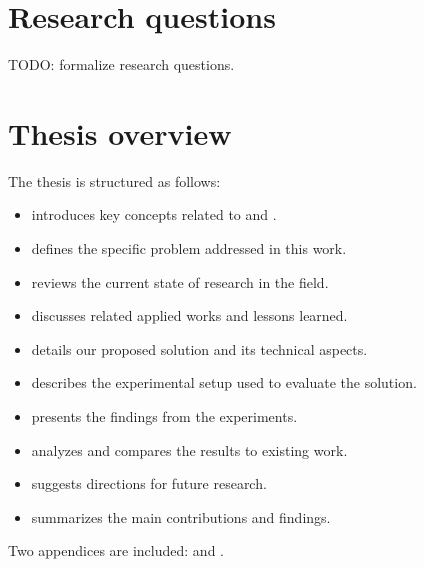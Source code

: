 \newpage %

\section{Research questions}

TODO: formalize research questions.

\section{Thesis overview}

The thesis is structured as follows:

\begin{itemize}
    \item {} introduces key concepts related to  and .
    \item {} defines the specific problem addressed in this work.
    \item {} reviews the current state of research in the field.
    \item {} discusses related applied works and lessons learned.
    \item {} details our proposed solution and its technical aspects.
    \item {} describes the experimental setup used to evaluate the solution.
    \item {} presents the findings from the experiments.
    \item {} analyzes and compares the results to existing work.
    \item {} suggests directions for future research.
    \item {} summarizes the main contributions and findings.
\end{itemize}

Two appendices are included:  and .

